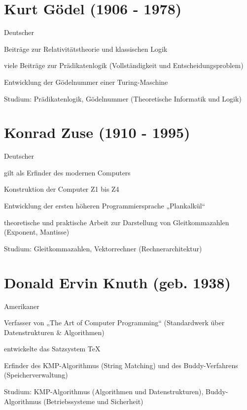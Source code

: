 \documentclass[a4paper,12pt]{report}
\begin{document}
\section*{Kurt Gödel (1906 - 1978)}
\begin{itemize*}
    \item Deutscher
    \item Beiträge zur Relativitätstheorie und klassischen Logik
    \item viele Beiträge zur Prädikatenlogik (Vollständigkeit und Entscheidungsproblem)
    \item Entwicklung der Gödelnummer einer Turing-Maschine
    \item Studium: Prädikatenlogik, Gödelnummer (Theoretische Informatik und Logik)
\end{itemize*}

\section*{Konrad Zuse (1910 - 1995)}
\begin{itemize*}
    \item Deutscher
    \item gilt als Erfinder des modernen Computers
    \item Konstruktion der Computer Z1 bis Z4
    \item Entwicklung der ersten höheren Programmiersprache „Plankalkül“
    \item theoretische und praktische Arbeit zur Darstellung von Gleitkommazahlen (Exponent,
          Mantisse)
    \item Studium: Gleitkommazahlen, Vektorrechner (Rechnerarchitektur)
\end{itemize*}

\section*{Donald Ervin Knuth (geb. 1938)}
\begin{itemize*}
    \item Amerikaner
    \item Verfasser von „The Art of Computer Programming“ (Standardwerk über Datenstrukturen \&
          Algorithmen)
    \item entwickelte das Satzsystem TeX
    \item Erfinder des KMP-Algorithmus (String Matching) und des Buddy-Verfahrens
          (Speicherverwaltung)
    \item Studium: KMP-Algorithmus (Algorithmen und Datenstrukturen), Buddy-Algorithmus
          (Betriebssysteme und Sicherheit)
\end{itemize*}
\end{document}
